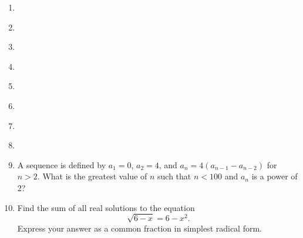 \documentclass{article}
\begin{document}
\begin{enumerate}
\item \underline{\hspace{3in}}\vspace{1cm}
\item \underline{\hspace{3in}}\vspace{1cm}
\item \underline{\hspace{3in}}\vspace{1cm}
\item \underline{\hspace{3in}}\vspace{1cm}
\item \underline{\hspace{3in}}\vspace{1cm}
\item \underline{\hspace{3in}}\vspace{1cm}
\item \underline{\hspace{3in}}\vspace{1cm}
\item \underline{\hspace{3in}}\vspace{1cm}
\item A sequence is defined by $a_1 = 0$, $a_2 = 4$, and $a_n = 4(a_{n - 1} - a_{n - 2})$ for $n > 2$. What is the greatest value of $n$ such that $n < 100$ and $a_n$ is a power of 2?\vspace{1cm}
\item Find the sum of all real solutions to the equation
\begin{equation*}
\sqrt{6 - x} = 6 - x^2.
\end{equation*}
Express your answer as a common fraction in simplest radical form.
\end{enumerate}
\end{document}
